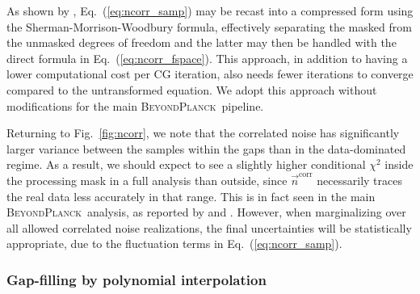 \documentclass{aa}
\newcommand{\n}[0]{\vec{n}}
\newcommand{\BP}{\textsc{BeyondPlanck}}
\begin{document}
As shown by \citet{bp02}, Eq.~(\ref{eq:ncorr_samp}) may be recast into
a compressed form using the Sherman-Morrison-Woodbury formula,
effectively separating the masked from the unmasked degrees of
freedom and the latter may then be handled with the direct formula in
Eq.~(\ref{eq:ncorr_fspace}). This approach, in addition to having a
lower computational cost per CG iteration, also needs fewer iterations
to converge compared to the untransformed equation. We adopt this
approach without modifications for the main \BP\ pipeline. 

Returning to Fig.~\ref{fig:ncorr}, we note that the correlated noise has significantly larger variance between the samples within the gaps than in the data-dominated regime. As a result, we should expect to see a
slightly higher conditional $\chi^2$ inside the processing mask in a
full analysis than outside, since $\n^{\mathrm{corr}}$ 
necessarily traces the real data less accurately in that range. This is
in fact seen in the main \BP\ analysis, as reported by
\citet{bp01} and \citet{bp10}. However, when marginalizing over all allowed
correlated noise realizations, the final uncertainties will be
statistically appropriate, due to the fluctuation terms in
Eq.~(\ref{eq:ncorr_samp}).

\subsubsection{Gap-filling by polynomial interpolation}
\end{document}
